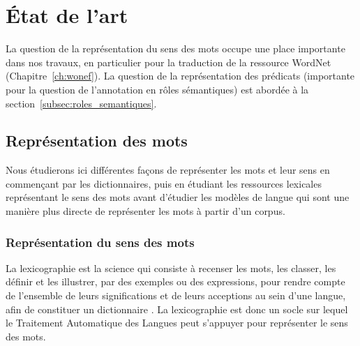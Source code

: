 \chapter{État de l'art} 
\label{ch:etatdelart} 


La question de la représentation du sens des mots occupe une place importante
dans nos travaux, en particulier pour la traduction de la ressource WordNet
(Chapitre~\ref{ch:wonef}). La question de la représentation des prédicats
(importante pour la question de l'annotation en rôles sémantiques) est abordée
à la section~\ref{subsec:roles_semantiques}.

\section{Représentation des mots}

Nous étudierons ici différentes façons de représenter les mots et leur sens en
commençant par les dictionnaires, puis en étudiant les ressources lexicales
représentant le sens des mots avant d'étudier les modèles de langue qui sont
une manière plus directe de représenter les mots à partir d'un corpus.

\subsection{Représentation du sens des mots}

La lexicographie est la science qui consiste à recenser les mots, les classer,
les définir et les illustrer, par des exemples ou des expressions, pour rendre
compte de l'ensemble de leurs significations et de leurs acceptions au sein
d'une langue, afin de constituer un dictionnaire
\citep{wikipedia2014lexicographie}. La lexicographie est donc un socle sur
lequel le Traitement Automatique des Langues peut s'appuyer pour représenter le
sens des mots.

